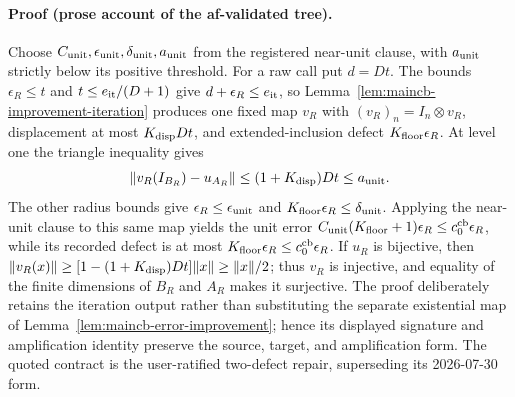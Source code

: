 \paragraph{Proof (prose account of the af-validated tree).}
Choose $C_{\rm unit},\epsilon_{\rm unit},\delta_{\rm unit},a_{\rm unit}$ from the
registered near-unit clause, with $a_{\rm unit}$ strictly below its positive threshold.
For a raw call put $d=Dt$.  The bounds $\epsilon_R\le t$ and
$t\le e_{\rm it}/(D+1)$ give $d+\epsilon_R\le e_{\rm it}$, so
Lemma~\ref{lem:maincb-improvement-iteration} produces one fixed map $v_R$ with
$(v_R)_n=I_n\otimes v_R$, displacement at most $K_{\rm disp}Dt$, and extended-inclusion
defect $K_{\rm floor}\epsilon_R$.  At level one the triangle inequality gives
\[
 \lVert v_R(I_{B_R})-u_{A_R}\rVert\le(1+K_{\rm disp})Dt\le a_{\rm unit}.
\]
The other radius bounds give $\epsilon_R\le\epsilon_{\rm unit}$ and
$K_{\rm floor}\epsilon_R\le\delta_{\rm unit}$.  Applying the near-unit clause to this
same map yields the unit error
$C_{\rm unit}(K_{\rm floor}+1)\epsilon_R\le c_0^{\rm cb}\epsilon_R$, while its recorded
defect is at most $K_{\rm floor}\epsilon_R\le c_0^{\rm cb}\epsilon_R$.
If $u_R$ is bijective, then
$\lVert v_R(x)\rVert\ge[1-(1+K_{\rm disp})Dt]\lVert x\rVert\ge\lVert x\rVert/2$; thus $v_R$ is injective,
and equality of the finite dimensions of $B_R$ and $A_R$ makes it surjective.
The proof deliberately retains the iteration output rather than substituting the separate
existential map of Lemma~\ref{lem:maincb-error-improvement}; hence its displayed signature
and amplification identity preserve the source, target, and amplification form.
The quoted contract is the user-ratified two-defect repair, superseding its 2026-07-30 form.


